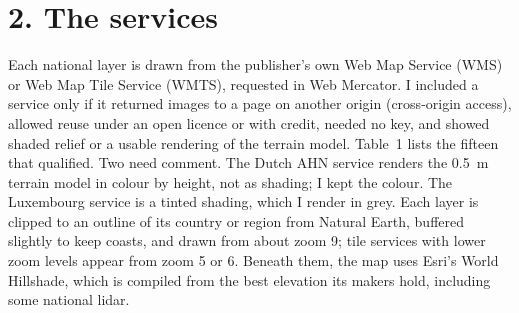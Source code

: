 \documentclass[11pt,a4paper]{article}
\begin{document}
\section*{2. The services}
Each national layer is drawn from the publisher's own Web Map Service (WMS) or Web Map Tile Service (WMTS), requested in Web Mercator. I included a service only if it returned images to a page on another origin (cross-origin access), allowed reuse under an open licence or with credit, needed no key, and showed shaded relief or a usable rendering of the terrain model. Table~1 lists the fifteen that qualified. Two need comment. The Dutch AHN service renders the 0.5~m terrain model in colour by height, not as shading; I kept the colour. The Luxembourg service is a tinted shading, which I render in grey. Each layer is clipped to an outline of its country or region from Natural Earth, buffered slightly to keep coasts, and drawn from about zoom 9; tile services with lower zoom levels appear from zoom 5 or 6. Beneath them, the map uses Esri's World Hillshade, which is compiled from the best elevation its makers hold, including some national lidar.
\end{document}

